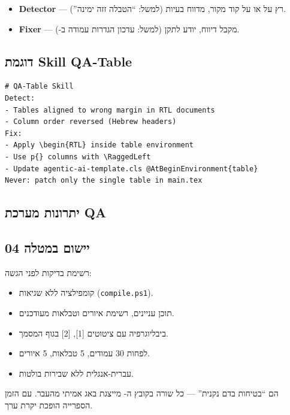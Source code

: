 \begin{itemize}[rightmargin=2em]
  \item \textbf{Detector} --- רץ על  או על קוד מקור, מדווח בעיות
    (למשל: ``הטבלה זזה ימינה'').
  \item \textbf{Fixer} --- מקבל דיווח, יודע לתקן (למשל: עדכון הגדרות
    עמודה ב-).
\end{itemize}

\subsection{דוגמת Skill QA-Table}

\begin{lstlisting}[caption={קטע מ-QA Skill לטבלאות}]
# QA-Table Skill
Detect:
- Tables aligned to wrong margin in RTL documents
- Column order reversed (Hebrew headers)
Fix:
- Apply \begin{RTL} inside table environment
- Use p{} columns with \RaggedLeft
- Update agentic-ai-template.cls @AtBeginEnvironment{table}
Never: patch only the single table in main.tex
\end{lstlisting}

\subsection{יתרונות מערכת QA}


\subsection{יישום במטלה 04}

רשימת בדיקות לפני הגשה:
\begin{itemize}[rightmargin=2em]
  \item קומפילציה ללא שגיאות (\texttt{compile.ps1}).
  \item תוכן עניינים, רשימת איורים וטבלאות מעודכנים.
  \item ביבליוגרפיה עם ציטוטים [1], [2] בגוף המסמך.
  \item לפחות 30 עמודים, 5 טבלאות, 5 איורים.
  \item עברית-אנגלית ללא שבירות בולטות.
\end{itemize}

\begin{insightbox}
 הם ``בטיחות בדם נקנית'' --- כל שורה בקובץ ה-
מייצגת באג אמיתי מהעבר. עם הזמן הספרייה הופכת יקרת ערך.
\end{insightbox}
